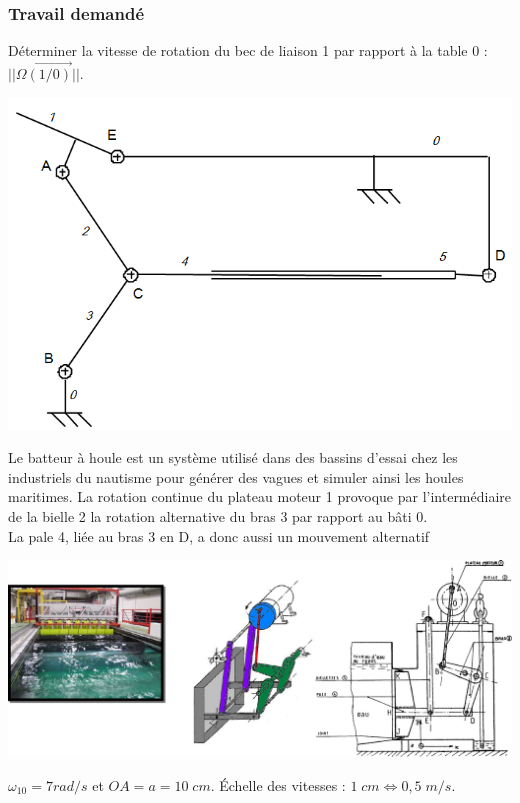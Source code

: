 \subsubsection{Travail demandé}
Déterminer la vitesse de rotation du bec de liaison 1 par rapport à la table 0 : $||\overrightarrow{\Omega(1/0)}||$.

\vspace{5cm}

\begin{center}
\includegraphics[width=.8\textwidth]{png/fig2-niveleur}
\end{center}
\newpage

Le batteur à houle est un système utilisé dans des bassins d’essai chez les industriels du nautisme pour 
générer des vagues et simuler ainsi les houles maritimes.
La rotation continue du plateau moteur 1 provoque par l'intermédiaire de la bielle 2 la rotation alternative du 
bras 3 par rapport au bâti 0.\\
La pale 4, liée au bras 3 en D, a donc aussi un mouvement alternatif

\begin{center}
\includegraphics[width=.8\textwidth]{png/fig1-batteurhoule}
\end{center}

$\omega_{10} = 7 rad/s$ et $OA =a= 10\; cm$. Échelle des vitesses : $1\; cm \Longleftrightarrow 0,5\; m/s$.

